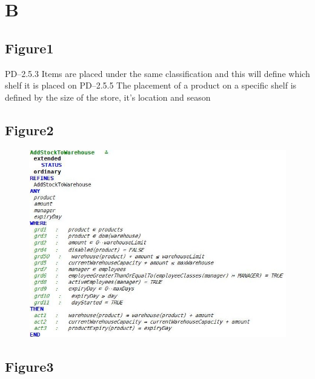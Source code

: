  \pagebreak 

 \pagebreak 

\section{B}
\label{b}

\subsection{Figure1}
\label{figure1}

PD--2.5.3 Items are placed under the same classification and this will define which shelf it is
placed on
PD--2.5.5 The placement of a product on a specific shelf is defined by the size of the store,
it’s location and season

\subsection{Figure2}
\label{figure2}

\begin{figure}[htbp]
\centering
\includegraphics[keepaspectratio,width=\textwidth,height=0.75\textheight]{2.jpg}
\label{}
\end{figure}


 \pagebreak 

\subsection{Figure3}
\label{figure3}

